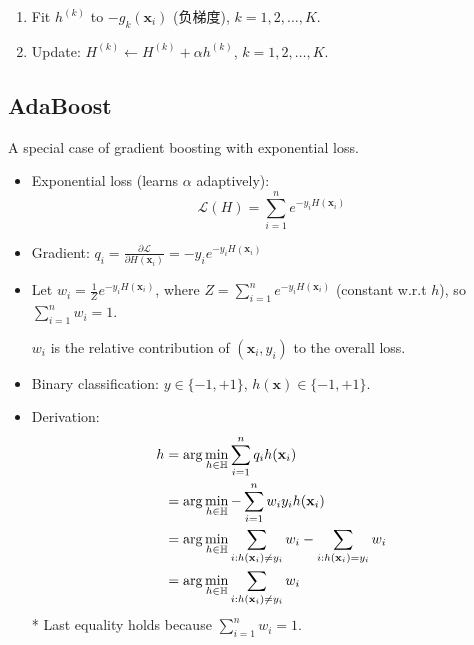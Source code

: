 \documentclass[UTF8]{ctexart}
\begin{document}
\begin{itemize}
\begin{itemize}
\begin{enumerate}
                \item Fit $h^{(k)}$ to $-g_k(\mathbf{x}_i)$ (负梯度), $k = 1, 2, \ldots, K$.
                
                \item Update: $H^{(k)} \leftarrow H^{(k)} + \alpha h^{(k)}$, $k = 1, 2, \ldots, K$.
            \end{enumerate}
        \end{itemize}
\end{itemize}

\subsection{AdaBoost}
A special case of gradient boosting with exponential loss.

\begin{itemize}
    \item Exponential loss (learns $\alpha$ adaptively):
    \[\mathcal{L}(H) = \sum_{i=1}^{n} e^{-y_i H(\mathbf{x}_i)}\]
    
    \item Gradient: $q_i = \frac{\partial \mathcal{L}}{\partial H(\mathbf{x}_i)} = -y_i e^{-y_i H(\mathbf{x}_i)}$
    
    \item Let $w_i = \frac{1}{Z} e^{-y_i H(\mathbf{x}_i)}$, where $Z = \sum_{i=1}^{n} e^{-y_i H(\mathbf{x}_i)}$ (constant w.r.t $h$), so $\sum_{i=1}^{n} w_i = 1$.
    
    $w_i$ is the relative contribution of $(\mathbf{x}_i, y_i)$ to the overall loss.
    
    \item Binary classification: $y \in \{-1, +1\}$, $h(\mathbf{x}) \in \{-1, +1\}$.
    
    \item Derivation:
    \begin{align}
        h &= \arg\min_{h \in \mathbb{H}} \sum_{i=1}^{n} q_i h(\mathbf{x}_i) \notag \\
        &= \arg\min_{h \in \mathbb{H}} -\sum_{i=1}^{n} w_i y_i h(\mathbf{x}_i) \notag \\
        &= \arg\min_{h \in \mathbb{H}} \sum_{i: h(\mathbf{x}_i) \neq y_i} w_i - \sum_{i: h(\mathbf{x}_i) = y_i} w_i \notag \\
        &= \arg\min_{h \in \mathbb{H}} \sum_{i: h(\mathbf{x}_i) \neq y_i} w_i \notag
    \end{align}
    * Last equality holds because $\sum_{i=1}^{n} w_i = 1$.
    

\end{itemize}
\end{document}
